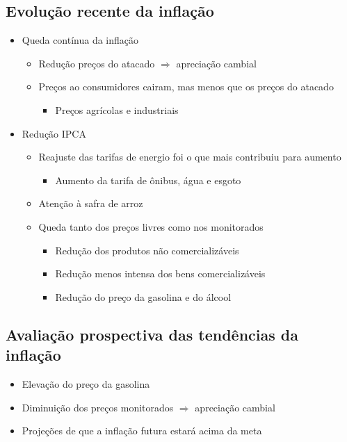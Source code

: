 \documentclass[11pt]{article}
\begin{document}
\subsection*{Evolução recente da inflação}
\label{sec:orgbd06b63}
\begin{itemize}
\item Queda contínua da inflação
\begin{itemize}
\item Redução preços do atacado \(\Rightarrow\) apreciação cambial
\item Preços ao consumidores cairam, mas menos que os preços do atacado
\begin{itemize}
\item Preços agrícolas e industriais
\end{itemize}
\end{itemize}
\item Redução IPCA
\begin{itemize}
\item Reajuste das tarifas de energio foi o que mais contribuiu para aumento
\begin{itemize}
\item Aumento da tarifa de ônibus, água e esgoto
\end{itemize}
\item Atenção à safra de arroz
\item Queda tanto dos preços livres como nos monitorados
\begin{itemize}
\item Redução dos produtos não comercializáveis
\item Redução menos intensa dos bens comercializáveis
\item Redução do preço da gasolina e do álcool
\end{itemize}
\end{itemize}
\end{itemize}
\subsection*{Avaliação prospectiva das tendências da inflação}
\label{sec:orgbd20fc2}
\begin{itemize}
\item Elevação do preço da gasolina
\item Diminuição dos preços monitorados \(\Rightarrow\) apreciação cambial
\item Projeções de que a inflação futura estará acima da meta
\end{itemize}
\end{document}
